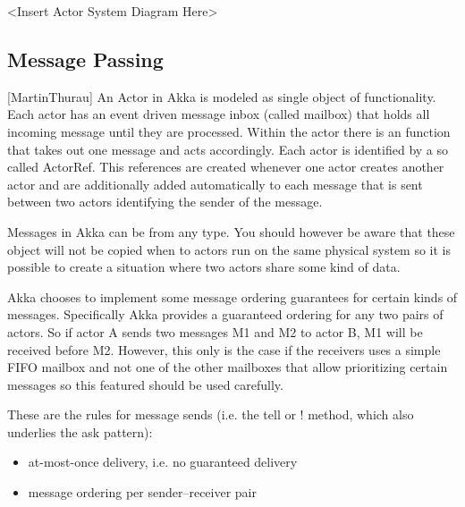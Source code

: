   <Insert Actor System Diagram Here>

  \subsection{Message Passing}[MartinThurau]
  An Actor in Akka is modeled as single object of functionality. Each actor has an event driven message inbox (called mailbox) that holds all incoming message until they are processed. Within the actor there is an function that takes out one message and acts accordingly. Each actor is identified by a so called ActorRef. This references are created whenever one actor creates another actor and are additionally added automatically to each message that is sent between two actors identifying the sender of the message.

  Messages in Akka can be from any type. You should however be aware that these object will not be copied when to actors run on the same physical system so it is possible to create a situation where two actors share some kind of data.

  Akka chooses to implement some message ordering guarantees for certain kinds of messages. Specifically Akka provides a guaranteed ordering for any two pairs of actors. So if actor A sends two messages M1 and M2 to actor B, M1 will be received before M2. However, this only is the case if the receivers uses a simple FIFO mailbox and not one of the other mailboxes that allow prioritizing certain messages so this featured should be used carefully.

  These are the rules for message sends (i.e. the tell or ! method, which also underlies the ask pattern): \cite{akkaJavaDoc}
  \begin{itemize}
    \item at-most-once delivery, i.e. no guaranteed delivery
    \item message ordering per sender–receiver pair
  \end{itemize}

